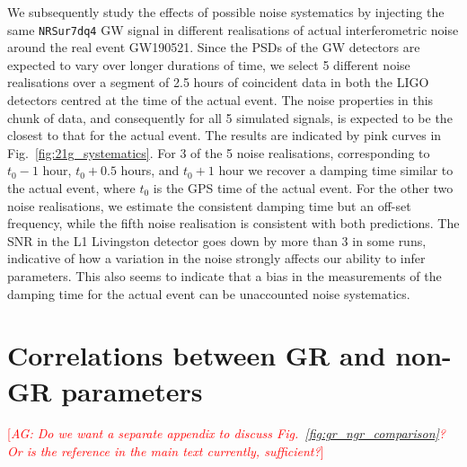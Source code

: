 \documentclass[twocolumn,prd,superscriptaddress,amsfonts,amssymb,amsmath,preprintnumbers]{revtex4-1}
\newcommand{\abhi}[1]{\textcolor{red}{[\textit{AG: #1}]}}
\begin{document}
We subsequently study the effects of possible noise systematics by injecting the same \texttt{NRSur7dq4} GW signal in different realisations of actual interferometric noise around the real event GW190521. Since the PSDs of the GW detectors are expected to vary over longer durations of time, we select 5 different noise realisations over a segment of 2.5 hours of coincident data in both the LIGO detectors centred at the time of the actual event. The noise properties in this chunk of data, and consequently for all 5 simulated signals, is expected to be the closest to that for the actual event. The results are indicated by pink curves in Fig.~\ref{fig:21g_systematics}. For 3 of the 5 noise realisations, corresponding to $t_0-1$ hour, $t_0+0.5$ hours, and $t_0+1$ hour we recover a damping time similar to the actual event, where $t_0$ is the GPS time of the actual event. For the other two noise realisations, we estimate the consistent damping time but an off-set frequency, while the fifth noise realisation is consistent with both predictions. The SNR in the L1 Livingston detector goes down by more than 3 in some runs, indicative of how a variation in the noise strongly affects our ability to infer parameters. This also seems to indicate that a bias in the measurements of the damping time for the actual event can be unaccounted noise systematics.

\section{Correlations between GR and non-GR parameters}\label{sec:correlations}
\abhi{Do we want a separate appendix to discuss Fig.~\ref{fig:gr_ngr_comparison}? Or is the reference in the main text currently, sufficient?}
\end{document}
